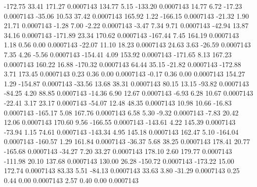      -172.75       33.41      171.27     0.0007143
      134.77        5.15     -133.20     0.0007143
       14.77        6.72      -17.23     0.0007143
      -35.06       10.53       37.42     0.0007143
      165.92        1.22     -166.15     0.0007143
      -21.32        1.90       21.71     0.0007143
       -1.28        7.00       -2.22     0.0007143
       -3.47        7.34        9.71     0.0007143
      -42.94       13.87       34.16     0.0007143
     -171.89       23.34      170.62     0.0007143
     -167.44        7.45      164.19     0.0007143
        1.18        0.56        0.00     0.0007143
      -22.07       11.10       18.23     0.0007143
       24.63        3.63      -26.59     0.0007143
        7.35        4.26       -5.56     0.0007143
     -154.41        4.09      153.92     0.0007143
     -171.65        8.13      167.23     0.0007143
      160.22       16.88     -170.32     0.0007143
       64.44       35.15      -21.82     0.0007143
     -172.88        3.71      173.45     0.0007143
        0.23        0.36        0.00     0.0007143
       -0.17        0.36        0.00     0.0007143
      154.27        1.29     -154.87     0.0007143
      -33.56       13.68       38.31     0.0007143
       80.15       13.15      -93.82     0.0007143
      -84.25        4.20       88.85     0.0007143
      -14.36        6.90       12.67     0.0007143
       -6.93        6.28       10.67     0.0007143
      -22.41        3.17       23.17     0.0007143
      -54.07       12.48       48.35     0.0007143
       10.98       10.66      -16.83     0.0007143
     -165.17        5.08      167.76     0.0007143
        6.58        5.30       -9.32     0.0007143
       -7.83       20.42       12.06     0.0007143
      170.60        9.56     -166.55     0.0007143
     -143.61        4.22      145.39     0.0007143
      -73.94        1.15       74.61     0.0007143
     -143.34        4.95      145.18     0.0007143
      162.47        5.10     -164.04     0.0007143
     -160.57        1.29      161.84     0.0007143
      -36.37        5.68       38.25     0.0007143
      178.41       20.77     -165.68     0.0007143
      -34.27        7.20       33.27     0.0007143
      178.10        2.60      179.77     0.0007143
     -111.98       20.10      137.68     0.0007143
      130.00       26.28     -150.72     0.0007143
     -173.22       15.00      172.74     0.0007143
       83.33        5.51      -84.13     0.0007143
       33.63        3.80      -31.29     0.0007143
        0.25        0.44        0.00     0.0007143
        2.57        0.40        0.00     0.0007143
